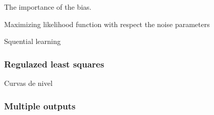 \begin{frame}{The importance of the bias.}
\end{frame}

\begin{frame}{Maximizing likelihood function with respect the noise parameters}
  
\end{frame}

\begin{frame}{Squential learning} 
\end{frame}

\begin{frame}
  \frametitle{Regulazed least squares}
Curvas de nivel
\end{frame}

\begin{frame}
  \frametitle{Multiple outputs}
\end{frame}